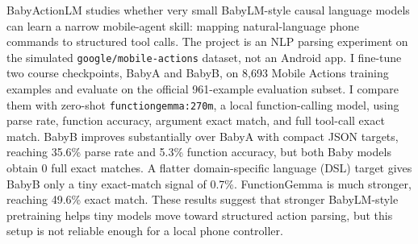 BabyActionLM studies whether very small BabyLM-style causal language models can learn a narrow mobile-agent skill: mapping natural-language phone commands to structured tool calls. The project is an NLP parsing experiment on the simulated \texttt{google/mobile-actions} dataset, not an Android app. I fine-tune two course checkpoints, BabyA and BabyB, on 8,693 Mobile Actions training examples and evaluate on the official 961-example evaluation subset. I compare them with zero-shot \texttt{functiongemma:270m}, a local function-calling model, using parse rate, function accuracy, argument exact match, and full tool-call exact match. BabyB improves substantially over BabyA with compact JSON targets, reaching 35.6\% parse rate and 5.3\% function accuracy, but both Baby models obtain 0 full exact matches. A flatter domain-specific language (DSL) target gives BabyB only a tiny exact-match signal of 0.7\%. FunctionGemma is much stronger, reaching 49.6\% exact match. These results suggest that stronger BabyLM-style pretraining helps tiny models move toward structured action parsing, but this setup is not reliable enough for a local phone controller.
